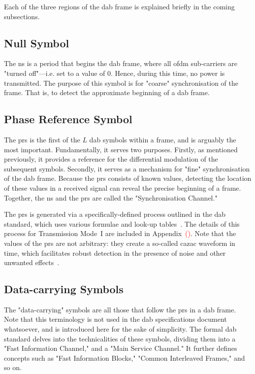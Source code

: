 \documentclass[class=report,11pt,crop=false]{standalone}
\begin{document}
Each of the three regions of the \gls{dab} frame is explained briefly in the coming subsections.

\subsection{Null Symbol \label{subsect:dab-std_null}}
The \gls{ns} is a period that begins the \gls{dab} frame, where all \gls{ofdm} sub-carriers are "turned off"---i.e. set to a value of 0. Hence, during this time, no power is transmitted. The purpose of this symbol is for "coarse" synchronisation of the frame. That is, to detect the approximate beginning of a \gls{dab} frame.

\subsection{Phase Reference Symbol \label{subsect:dab-std_prs}}
The \gls{prs} is the first of the \(L\) \gls{dab} symbols within a frame, and is arguably the most important. Fundamentally, it serves two purposes. Firstly, as mentioned previously, it provides a reference for the differential modulation of the subsequent symbols. Secondly, it serves as a mechanism for "fine" synchronisation of the \gls{dab} frame. Because the \gls{prs} consists of known values, detecting the location of these values in a received signal can reveal the precise beginning of a frame. Together, the \gls{ns} and the \gls{prs} are called the "Synchronisation Channel."

The \gls{prs} is generated via a specifically-defined process outlined in the \gls{dab} standard, which uses various formulae and look-up tables~\cite{dabstandard}. The details of this process for Transmission Mode~I are included in Appendix~\textcolor{red}{()}. Note that the values of the \gls{prs} are not arbitrary: they create a so-called \gls{cazac} waveform in time, which facilitates robust detection in the presence of noise and other unwanted effects~\cite{gandy2003dab}.

\subsection{Data-carrying Symbols \label{subsect:dab-std_data}}
The "data-carrying" symbols are all those that follow the \gls{prs} in a \gls{dab} frame. Note that this terminology is not used in the \gls{dab} specifications document whatsoever, and is introduced here for the sake of simplicity. The formal \gls{dab} standard delves into the technicalities of these symbols, dividing them into a "Fast Information Channel," and a "Main Service Channel." It further defines concepts such as "Fast Information Blocks," "Common Interleaved Frames," and so on.
\end{document}
